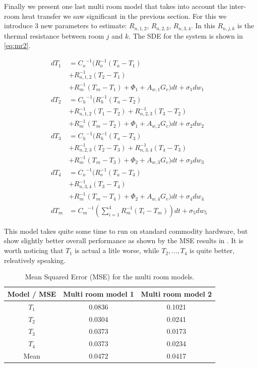 \documentclass[a4paper]{article}
\begin{document}
Finally we present one last multi room model that takes into account the inter-room heat transfer we saw significant in the previous section. For this we introduce 3 new parameters to estimate: $R_{n,1,2}$, $R_{n,2,3}$, $R_{n,3,4}$. In this $R_{n,j,k}$ is the thermal resistance between room $j$ and $k$. The SDE for the system is shown in \cref{eq:mr2}. 

\begin{equation}
    \begin{aligned}
    dT_1 &= {C_o}^{-1} ( R_o^{-1} (T_a - T_1) \\
         &+ R_{n,1,2}^{-1} (T_2 - T_1) \\
         &+ R_m^{-1} (T_m - T_1) + \Phi_1 + A_{w,1} G_v ) \mathit{dt} + \sigma_1 \mathit{dw}_1 \\
    dT_2 &= {C_h}^{-1} ( R_h^{-1} (T_a - T_2) \\
         &+ R_{n,1,2}^{-1} (T_1 - T_2) + R_{n,2,3}^{-1} (T_3 - T_2) \\
         &+ R_m^{-1} (T_m - T_2) + \Phi_1 + A_{w,2} G_v ) \mathit{dt} + \sigma_2 \mathit{dw}_2 \\
    dT_3 &= {C_h}^{-1} ( R_h^{-1} (T_a - T_3) \\
        &+ R_{n,2,3}^{-1} (T_2 - T_3) + R_{n,3,4}^{-1} (T_4 - T_3) \\
        &+ R_m^{-1} (T_m - T_3) + \Phi_2 + A_{w,3} G_v ) \mathit{dt} + \sigma_3 \mathit{dw}_3 \\
    dT_4 &= {C_o}^{-1} ( R_o^{-1} (T_a - T_4) \\
        &+ R_{n,3,4}^{-1} (T_3 - T_4) \\
        &+ R_m^{-1} (T_m - T_4) + \Phi_2 + A_{w,4} G_v ) \mathit{dt} + \sigma_4 \mathit{dw}_4 \\
    dT_m &= {C_m}^{-1} \left( \sum_{i = 1}^4 R_m^{-1} (T_i - T_m) \right) \mathit{dt} + \sigma_5 \mathit{dw}_5 
    \end{aligned}
    \label{eq:mr2}
\end{equation}

This model takes quite some time to run on standard commodity hardware, but show slightly better overall performance as shown by the MSE results in . It is worth noticing that $T_1$ is actual a litle worse, while $T_2, \ldots, T_4$ is quite better, releatively speaking.

\begin{table}[ht!]
    \centering
    \begin{tabular}{ccc}
        Model / MSE & Multi room model 1 & Multi room model 2 \\ \hline \hline
        $T_1$  & 0.0836 & 0.1021 \\ \hline
        $T_2$  & 0.0304 & 0.0241 \\ \hline
        $T_3$  & 0.0373 & 0.0173 \\ \hline
        $T_4$  & 0.0373 & 0.0234 \\ \hline
        Mean   & 0.0472 & 0.0417
    \end{tabular}
    \caption{Mean Squared Error (MSE) for the multi room models.}
    \label{tab:part2c}
\end{table}
\end{document}

